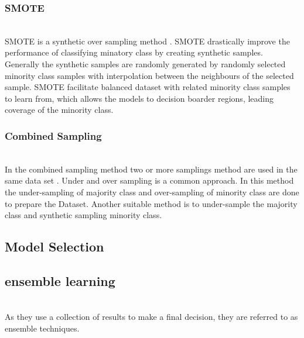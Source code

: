 \subsubsection{SMOTE}\hspace*{\fill} \\
SMOTE is a synthetic over sampling method \cite{2002}. SMOTE drastically improve the performance of classifying minatory class by creating synthetic samples. Generally the synthetic samples are randomly generated by randomly selected minority class samples with interpolation between the neighbours of the selected sample. SMOTE facilitate balanced dataset with related minority class samples to learn from, which allows the models to decision boarder regions,  leading coverage of the minority class.

\subsubsection{Combined Sampling}\hspace*{\fill} \\
In the combined sampling method two or more samplings method are used in the same data set \cite{10.1145/3055635.3056643}. Under and over sampling is a common approach. In this method the under-sampling of majority class and over-sampling of minority class are done to prepare the Dataset. Another suitable method is to under-sample the majority class and synthetic sampling minority class. 

\subsection{Model Selection}

\subsection{ensemble learning}\hspace*{\fill} \\
As they use a collection of results to make a final decision, they are referred to as ensemble techniques.

